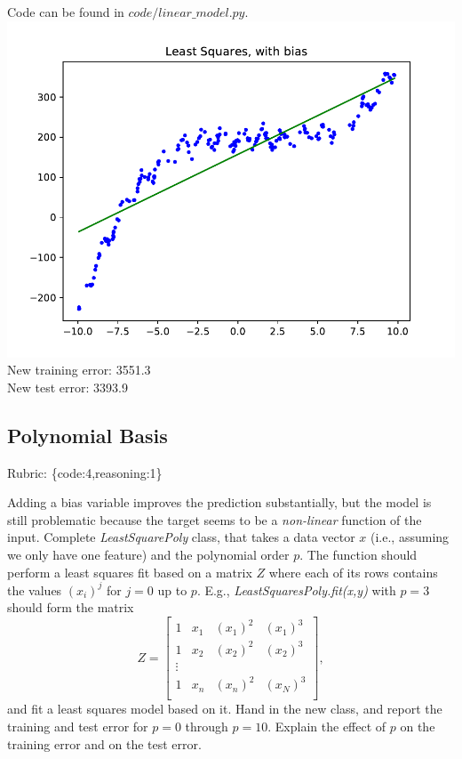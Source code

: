 \documentclass{article}
\def\rubric#1{\gre{Rubric: \{#1\}}}{}
\def\blu#1{{\color{blu}#1}}
\def\gre#1{{\color{gre}#1}}
\begin{document}
Code can be found in $code/linear\_model.py$.
\\ \includegraphics{../figs/least_squares_bias.pdf}
\\ New training error: 3551.3
\\ New test error: 3393.9

\subsection{Polynomial Basis}
\rubric{code:4,reasoning:1}

Adding a bias variable improves the prediction substantially, but the model is still problematic because the target seems to be a \emph{non-linear} function of the input.
Complete \emph{LeastSquarePoly} class, that takes a data vector $x$ (i.e., assuming we only have one feature) and the polynomial order $p$. The function should perform a least squares fit based on a matrix $Z$ where each of its rows contains the values $(x_{i})^j$ for $j=0$ up to $p$. E.g., \emph{LeastSquaresPoly.fit(x,y)}  with $p = 3$ should form the matrix
\[
Z =
\left[\begin{array}{cccc}
1 & x_1 & (x_1)^2 & (x_1)^3\\
1 & x_2 & (x_2)^2 & (x_2)^3\\
\vdots\\
1 & x_n & (x_n)^2 & (x_N)^3\\
\end{array}
\right],
\]
and fit a least squares model based on it.
\blu{Hand in the new class, and report the training and test error for $p = 0$ through $p= 10$. Explain the effect of $p$ on the training error and on the test error.}
\end{document}
